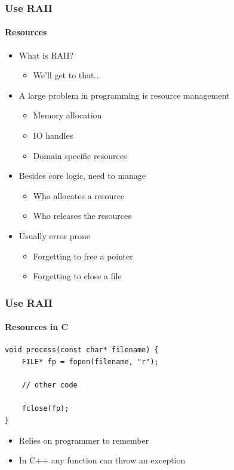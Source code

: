\documentclass[table]{beamer}
\newcounter{rulecount}
\newcommand{\declarerule}{\textbf{\color{themeblue}{Rule \therulecount:}} }
\begin{document}
\begin{frame}
    \frametitle{\declarerule Use RAII}
    \framesubtitle{Resources}
    \begin{itemize}
        \item What is RAII?
            \begin{itemize}
                \item We'll get to that...
            \end{itemize}
        \item A large problem in programming is resource management
            \begin{itemize}
                \item Memory allocation
                \item IO handles
                \item Domain specific resources
            \end{itemize}
        \item Besides core logic, need to manage
            \begin{itemize}
                \item Who allocates a resource
                \item Who releases the resources
            \end{itemize}
        \item Usually error prone
            \begin{itemize}
                \item Forgetting to free a pointer
                \item Forgetting to close a file
            \end{itemize}
    \end{itemize}
\end{frame}

\begin{frame}[fragile]
    \frametitle{\declarerule Use RAII}
    \framesubtitle{Resources in C}
    \begin{lstlisting}[title=Reading a file in C]
void process(const char* filename) {
    FILE* fp = fopen(filename, "r");

    // other code

    fclose(fp);
}
    \end{lstlisting}
    \begin{itemize}
        \item Relies on programmer to remember
        \item In C++ any function can throw an exception
    \end{itemize}
\end{frame}
\end{document}
